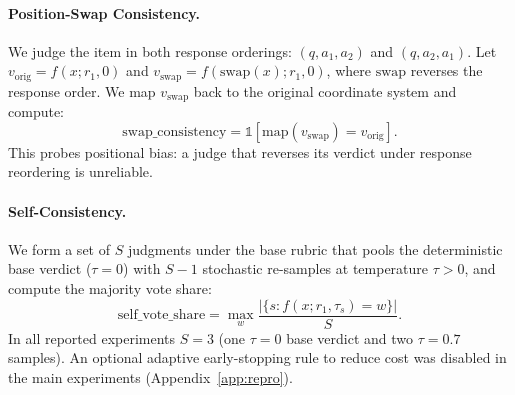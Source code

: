 \paragraph{Position-Swap Consistency.}
We judge the item in both response orderings: $(q, a_1, a_2)$ and $(q, a_2, a_1)$.
Let $v_{\text{orig}} = f(x; r_1, 0)$ and $v_{\text{swap}} = f(\text{swap}(x); r_1, 0)$, where $\text{swap}$ reverses the response order.
We map $v_{\text{swap}}$ back to the original coordinate system and compute:
\begin{equation}
    \text{swap\_consistency} = \mathbb{1}\!\left[\text{map}(v_{\text{swap}}) = v_{\text{orig}}\right].
    \label{eq:swap}
\end{equation}
This probes positional bias: a judge that reverses its verdict under response reordering is unreliable.

\paragraph{Self-Consistency.}
We form a set of $S$ judgments under the base rubric that pools the deterministic base verdict ($\tau{=}0$) with $S-1$ stochastic re-samples at temperature $\tau>0$, and compute the majority vote share:
\begin{equation}
    \text{self\_vote\_share} = \max_{w} \frac{|\{s : f(x; r_1, \tau_s) = w\}|}{S}.
    \label{eq:self}
\end{equation}
In all reported experiments $S=3$ (one $\tau{=}0$ base verdict and two $\tau{=}0.7$ samples). An optional adaptive early-stopping rule to reduce cost was disabled in the main experiments (Appendix~\ref{app:repro}).

